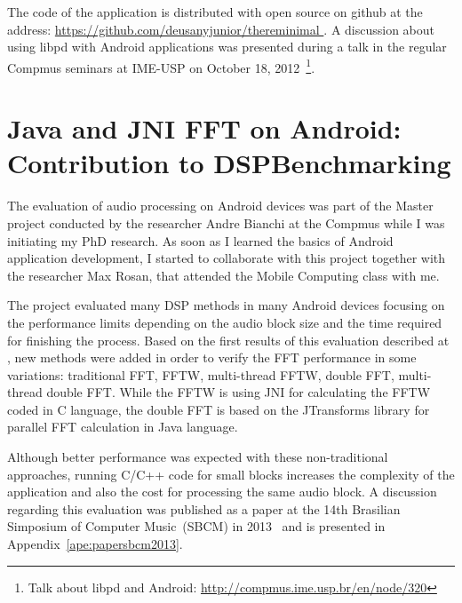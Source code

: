 The code of the application is distributed with open source on github at the address: \url{https://github.com/deusanyjunior/thereminimal
}.
A discussion about using libpd with Android applications was presented during a talk in the regular Compmus seminars at IME-USP on October 18, 2012~\footnote{Talk about libpd and Android: \url{http://compmus.ime.usp.br/en/node/320}}.


\section{Java and JNI FFT on Android: Contribution to DSPBenchmarking}
\label{sec:appdspbenchmarking}

The evaluation of audio processing on Android devices was part of the Master project conducted by the researcher Andre Bianchi at the Compmus while I was initiating my PhD research.
As soon as I learned the basics of Android application development, I started to collaborate with this project together with the researcher Max Rosan, that attended the Mobile Computing class with me.

The project evaluated many DSP methods in many Android devices focusing on the performance limits depending on the audio block size and the time required for finishing the process.
Based on the first results of this evaluation described at \cite{Bianchi2012ontheperformance}, new methods were added in order to verify the FFT performance in some variations:
traditional FFT, FFTW, multi-thread FFTW, double FFT, multi-thread double FFT.
While the FFTW is using JNI for calculating the FFTW coded in C language, the double FFT is based on the JTransforms library for parallel FFT calculation in Java language.

Although better performance was expected with these non-traditional approaches, running C/C++ code for small blocks increases the complexity of the application and also the cost for processing the same audio block.
A discussion regarding this evaluation was published as a paper at the 14th Brasilian Simposium of Computer Music~(SBCM) in 2013~\citep{deCarvalhoJunior2013fftbenchmark} and is presented in Appendix~\ref{ape:papersbcm2013}.

